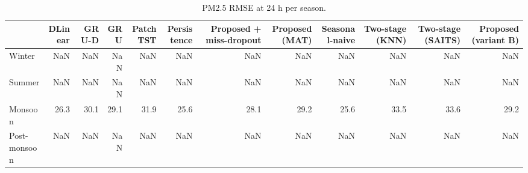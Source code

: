 \begin{table}
\caption{PM2.5 RMSE at 24 h per season.}
\label{tab:seasonal}
\begin{tabular}{lrrrrrrrrrrr}
\toprule
 & DLinear & GRU-D & GRU & PatchTST & Persistence & Proposed + miss-dropout & Proposed (MAT) & Seasonal-naive & Two-stage (KNN) & Two-stage (SAITS) & Proposed (variant B) \\
\midrule
Winter & NaN & NaN & NaN & NaN & NaN & NaN & NaN & NaN & NaN & NaN & NaN \\
Summer & NaN & NaN & NaN & NaN & NaN & NaN & NaN & NaN & NaN & NaN & NaN \\
Monsoon & 26.3 & 30.1 & 29.1 & 31.9 & 25.6 & 28.1 & 29.2 & 25.6 & 33.5 & 33.6 & 29.2 \\
Post-monsoon & NaN & NaN & NaN & NaN & NaN & NaN & NaN & NaN & NaN & NaN & NaN \\
\bottomrule
\end{tabular}
\end{table}
